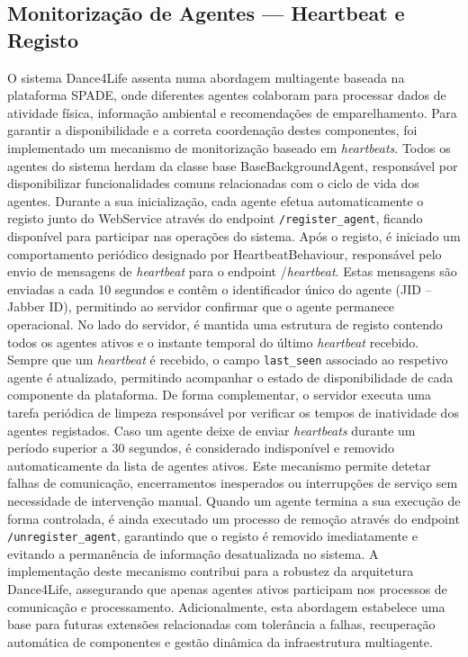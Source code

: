 \documentclass[runningheads]{llncs}
\begin{document}
\subsection{Monitorização de Agentes — Heartbeat e Registo}
O sistema Dance4Life assenta numa abordagem multiagente baseada na plataforma SPADE, onde diferentes agentes colaboram para processar dados de atividade física, informação ambiental e recomendações de emparelhamento. Para garantir a disponibilidade e a correta coordenação destes componentes, foi implementado um mecanismo de monitorização baseado em \textit{heartbeats}. 
Todos os agentes do sistema herdam da classe base BaseBackgroundAgent, responsável por disponibilizar funcionalidades comuns relacionadas com o ciclo de vida dos agentes. Durante a sua inicialização, cada agente efetua automaticamente o registo junto do WebService através do endpoint \texttt{/register\_agent}, ficando disponível para participar nas operações do sistema. 
Após o registo, é iniciado um comportamento periódico designado por HeartbeatBehaviour, responsável pelo envio de mensagens de \textit{heartbeat} para o endpoint /\textit{heartbeat}. Estas mensagens são enviadas a cada 10 segundos e contêm o identificador único do agente (JID – Jabber ID), permitindo ao servidor confirmar que o agente permanece operacional. 
No lado do servidor, é mantida uma estrutura de registo contendo todos os agentes ativos e o instante temporal do último \textit{heartbeat} recebido. Sempre que um \textit{heartbeat} é recebido, o campo \texttt{last\_seen} associado ao respetivo agente é atualizado, permitindo acompanhar o estado de disponibilidade de cada componente da plataforma. 
De forma complementar, o servidor executa uma tarefa periódica de limpeza responsável por verificar os tempos de inatividade dos agentes registados. Caso um agente deixe de enviar \textit{heartbeats} durante um período superior a 30 segundos, é considerado indisponível e removido automaticamente da lista de agentes ativos. Este mecanismo permite detetar falhas de comunicação, encerramentos inesperados ou interrupções de serviço sem necessidade de intervenção manual. 
Quando um agente termina a sua execução de forma controlada, é ainda executado um processo de remoção através do endpoint \texttt{/unregister\_agent}, garantindo que o registo é removido imediatamente e evitando a permanência de informação desatualizada no sistema. 
A implementação deste mecanismo contribui para a robustez da arquitetura Dance4Life, assegurando que apenas agentes ativos participam nos processos de comunicação e processamento. Adicionalmente, esta abordagem estabelece uma base para futuras extensões relacionadas com tolerância a falhas, recuperação automática de componentes e gestão dinâmica da infraestrutura multiagente. 
\end{document}
